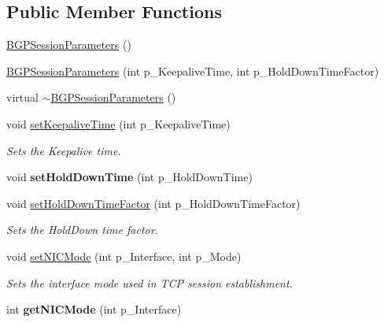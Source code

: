 \subsection*{Public Member Functions}
\begin{DoxyCompactItemize}
\item 
\hyperlink{classBGPSessionParameters_ae3d4f579822be095d01bfd4cab18033e}{B\-G\-P\-Session\-Parameters} ()
\item 
\hyperlink{classBGPSessionParameters_a11f44412906552a220daff73da0c1992}{B\-G\-P\-Session\-Parameters} (int p\-\_\-\-Keepalive\-Time, int p\-\_\-\-Hold\-Down\-Time\-Factor)
\item 
virtual \hyperlink{classBGPSessionParameters_a3f2dc608214dc93d33862c194be3fbee}{$\sim$\-B\-G\-P\-Session\-Parameters} ()
\item 
void \hyperlink{classBGPSessionParameters_af9feb193d7de00f2e44d9866dc7c7100}{set\-Keepalive\-Time} (int p\-\_\-\-Keepalive\-Time)
\begin{DoxyCompactList}\small\item\em Sets the Keepalive time. \end{DoxyCompactList}\item 
\hypertarget{classBGPSessionParameters_a4164a26b4457a22e93fd78f098c1691c}{void {\bfseries set\-Hold\-Down\-Time} (int p\-\_\-\-Hold\-Down\-Time)}\label{classBGPSessionParameters_a4164a26b4457a22e93fd78f098c1691c}

\item 
void \hyperlink{classBGPSessionParameters_a9ecde9c6514a451337b8f3043268286e}{set\-Hold\-Down\-Time\-Factor} (int p\-\_\-\-Hold\-Down\-Time\-Factor)
\begin{DoxyCompactList}\small\item\em Sets the Hold\-Down time factor. \end{DoxyCompactList}\item 
void \hyperlink{classBGPSessionParameters_a7348f562b2c3a6acec49cf2d10c535b1}{set\-N\-I\-C\-Mode} (int p\-\_\-\-Interface, int p\-\_\-\-Mode)
\begin{DoxyCompactList}\small\item\em Sets the interface mode used in T\-C\-P session establishment. \end{DoxyCompactList}\item 
\hypertarget{classBGPSessionParameters_abbb9bf5608aa7a47047496bf2a04d46e}{int {\bfseries get\-N\-I\-C\-Mode} (int p\-\_\-\-Interface)}\label{classBGPSessionParameters_abbb9bf5608aa7a47047496bf2a04d46e}


\end{DoxyCompactItemize}
